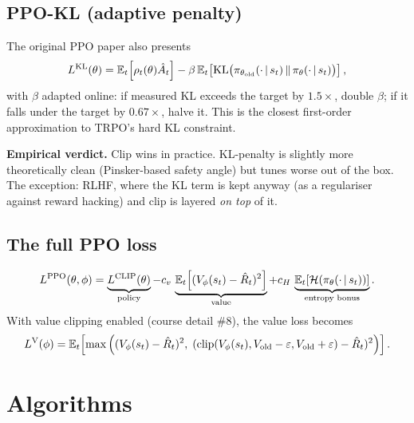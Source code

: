 \documentclass[11pt,oneside]{scrbook}
\begin{document}
\section{PPO-KL (adaptive penalty)}

The original PPO paper also presents
\[
  L^{\mathrm{KL}}(\theta) = \mathbb{E}_t\!\left[\rho_t(\theta) \hat{A}_t\right] - \beta\, \mathbb{E}_t\!\left[\mathrm{KL}\big(\pi_{\theta_\text{old}}(\cdot\,\vert\, s_t)\,\|\,\pi_\theta(\cdot\,\vert\, s_t)\big)\right],
\]
with $\beta$ adapted online: if measured KL exceeds the target by $1.5\times$, double $\beta$; if it falls under the target by $0.67\times$, halve it. This is the closest first-order approximation to TRPO's hard KL constraint.

\textbf{Empirical verdict.} Clip wins in practice. KL-penalty is slightly more theoretically clean (Pinsker-based safety angle) but tunes worse out of the box. The exception: RLHF, where the KL term is kept anyway (as a regulariser against reward hacking) and clip is layered \emph{on top} of it.

\section{The full PPO loss}

\[
  L^{\mathrm{PPO}}(\theta, \phi) =
  \underbrace{L^{\mathrm{CLIP}}(\theta)}_\text{policy}
  - c_v\, \underbrace{\mathbb{E}_t\!\left[(V_\phi(s_t) - \hat R_t)^2\right]}_\text{value}
  + c_H\, \underbrace{\mathbb{E}_t\!\left[\mathcal{H}(\pi_\theta(\cdot\,\vert\, s_t))\right]}_\text{entropy bonus}.
\]
With value clipping enabled (course detail \#8), the value loss becomes
\[
  L^{\mathrm{V}}(\phi) = \mathbb{E}_t\!\left[\max\Big( (V_\phi(s_t) - \hat R_t)^2,\; (\mathrm{clip}(V_\phi(s_t), V_\text{old} - \varepsilon, V_\text{old}+\varepsilon) - \hat R_t)^2 \Big)\right].
\]

\chapter{Algorithms}
\end{document}
